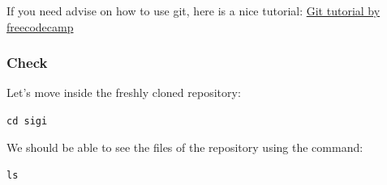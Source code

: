 \documentclass{article}
\begin{document}
If you need advise on how to use git, here is a nice tutorial:
\href{https://www.freecodecamp.org/news/learn-the-basics-of-git-in-under-10-minutes-da548267cc91/
}{Git tutorial by freecodecamp}

\subsubsection{Check}

Let's move inside the freshly cloned repository:

\texttt{cd sigi}

We should be able to see the files of the repository using the command:

\texttt{ls}
\end{document}
